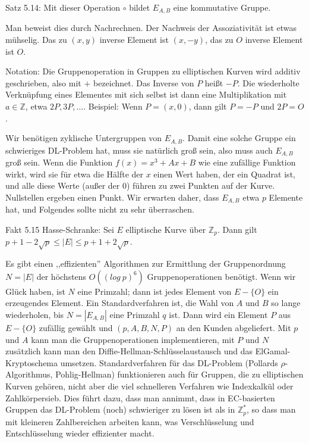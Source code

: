 \documentclass[a4paper]{article}
\begin{document}
\begin{multicols}{3}
    Satz 5.14: Mit dieser Operation $\circ$ bildet $E_{A,B}$ eine kommutative Gruppe.

    Man beweist dies durch Nachrechnen. Der Nachweis der Assoziativität ist etwas mühselig. Das zu $(x,y)$ inverse Element ist $(x,-y)$, das zu $O$ inverse Element ist $O$.

    Notation: Die Gruppenoperation in Gruppen zu elliptischen Kurven wird additiv geschrieben, also mit $+$ bezeichnet. Das Inverse von $P$ heißt $-P$. Die wiederholte Verknüpfung eines Elementes mit sich selbst ist dann eine Multiplikation mit $a\in\mathbb{Z}$, etwa $2P, 3P,...$.
    Beispiel: Wenn $P=(x,0)$, dann gilt $P=-P$ und $2P=O$.

    Wir benötigen zyklische Untergruppen von $E_{A,B}$. Damit eine solche Gruppe ein schwieriges DL-Problem hat, muss sie natürlich groß sein, also muss auch $E_{A,B}$ groß sein. Wenn die Funktion $f(x) =x^3+Ax+B$ wie eine zufällige Funktion wirkt, wird sie für etwa die Hälfte der $x$ einen Wert haben, der ein Quadrat ist, und alle diese Werte (außer der $0$) führen zu zwei Punkten auf der Kurve. Nullstellen ergeben einen Punkt. Wir erwarten daher, dass $E_{A,B}$ etwa $p$ Elemente hat, und Folgendes sollte nicht zu sehr überraschen.

    Fakt 5.15 Hasse-Schranke: Sei $E$ elliptische Kurve über $\mathbb{Z}_p$. Dann gilt $p+ 1- 2\sqrt{p}\leq |E|\leq p+1 + 2\sqrt{p}$.

    Es gibt einen ,,effizienten'' Algorithmen zur Ermittlung der Gruppenordnung $N=|E|$ der höchstens $O((log\ p)^6)$ Gruppenoperationen benötigt. Wenn wir Glück haben, ist $N$ eine Primzahl; dann ist jedes Element von $E-\{O\}$ ein erzeugendes Element. Ein Standardverfahren ist, die Wahl von $A$ und $B$ so lange wiederholen, bis $N=|E_{A,B}|$ eine Primzahl $q$ ist. Dann wird ein Element $P$ aus $E-\{O\}$ zufällig gewählt und $(p,A,B,N,P)$ an den Kunden abgeliefert. Mit $p$ und $A$ kann man die Gruppenoperationen implementieren, mit $P$ und $N$ zusätzlich kann man den Diffie-Hellman-Schlüsselaustausch und das ElGamal-Kryptoschema umsetzen.
    Standardverfahren für das DL-Problem (Pollards ${\rho}$-Algorithmus, Pohlig-Hellman) funktionieren auch für Gruppen, die zu elliptischen Kurven gehören, nicht aber die viel schnelleren Verfahren wie Indexkalkül oder Zahlkörpersieb. Dies führt dazu, dass man annimmt, dass in EC-basierten Gruppen das DL-Problem (noch) schwieriger zu lösen ist als in $\mathbb{Z}^*_p$, so dass man mit kleineren Zahlbereichen arbeiten kann, was Verschlüsselung und Entschlüsselung wieder effizienter macht.


\end{multicols}
\end{document}
